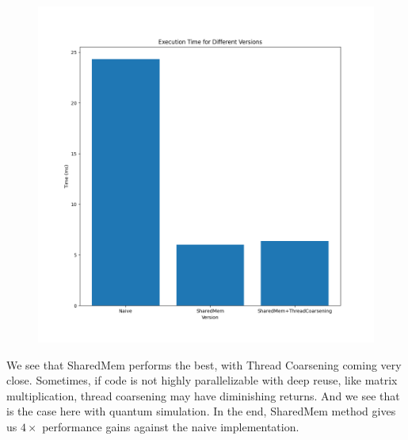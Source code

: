 \documentclass{article}
\begin{document}
\begin{figure}[H]
    \centerline{\includegraphics[width=6in]{quantum_time.png}}
\end{figure}

We see that SharedMem performs the best, with Thread Coarsening coming very close. Sometimes, if code is not highly parallelizable with deep reuse, like matrix multiplication, thread coarsening may have diminishing returns. And we see that is the case here with quantum simulation. In the end, SharedMem method gives us $4\times$ performance gains against the naive implementation. 



\end{document}
